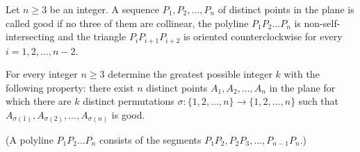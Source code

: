 Let $n \geq 3$ be an integer. A sequence $P_1, P_2, \ldots, P_n$ of distinct points in the plane is called good if no three of them are collinear, the polyline $P_1P_2 \ldots P_n$ is non-self-intersecting and the triangle $P_iP_{i + 1}P_{i + 2}$ is oriented counterclockwise for every $i = 1, 2, \ldots, n - 2$.

For every integer $n \geq 3$ determine the greatest possible integer $k$ with the following property: there exist $n$ distinct points $A_1, A_2, \ldots, A_n$ in the plane for which there are $k$ distinct permutations $\sigma : \{1, 2, \ldots, n\} \to \{1, 2, \ldots, n\}$ such that $A_{\sigma(1)}, A_{\sigma(2)}, \ldots, A_{\sigma(n)}$ is good.

(A polyline $P_1P_2 \ldots P_n$ consists of the segments $P_1P_2, P_2P_3, \ldots, P_{n - 1}P_n$.)